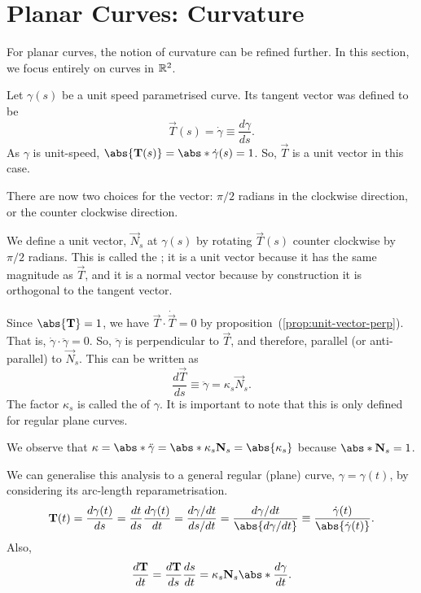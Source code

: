 \documentclass[11pt]{penrose}
\newcommand{\vT}{\vec{T}}
\newcommand{\vN}{\vec{N}}
\begin{document}
\section{Planar Curves: Curvature}

For planar curves, the notion of curvature can be refined further. In this section, we focus entirely on curves in $\mathbb{R}^2$.

Let $\gamma(s)$ be a unit speed parametrised curve. Its tangent vector was defined to be
\begin{equation}
    \vT(s) = \dot{\gamma} \equiv \frac{d\gamma}{ds}.
    \label{eq:tangent-dfn}
\end{equation}
As $\gamma$ is unit-speed, $\abs{\vT(s)} = \abs*{\dot{\gamma}(s)} = 1$. So, $\vT$ is a unit vector in this case.

There are now two choices for the  vector: $\pi/2$ radians in the clockwise direction, or the counter clockwise direction.

We define a unit vector, $\vN_s$ at $\gamma(s)$ by rotating $\vT(s)$ counter clockwise by $\pi/2$ radians. This is called the ; it is a unit vector because it has the same magnitude as $\vT$, and it is a normal vector because by construction it is orthogonal to the tangent vector.

Since $\abs{\vT} = 1$, we have $\vT \cdot \dot{\vT} = 0$ by proposition~(\ref{prop:unit-vector-perp}). That is, $\dot{\gamma} \cdot \ddot{\gamma} = 0$. So, $\ddot{\gamma}$ is perpendicular to $\vT$, and therefore, parallel (or anti-parallel) to $\vN_s$. This can be written as
\begin{equation}
    \frac{d\vT}{ds} \equiv \ddot{\gamma} = \kappa_s \vN_s.
\end{equation}
The factor $\kappa_s$ is called the  of $\gamma$. It is important to note that this is only defined for regular plane curves.

We observe that $\kappa = \abs*{\ddot{\gamma}} = \abs*{\kappa_s \vN_s} = \abs{\kappa_s}$ because $\abs*{\vN_s} = 1$.


We can generalise this analysis to a general regular (plane) curve, $\gamma = \gamma(t)$, by considering its arc-length reparametrisation.
\begin{equation}
    \vT(t)
    = \frac{d\gamma(t)}{ds}
    = \frac{dt}{ds} \frac{d\gamma(t)}{dt}
    = \frac{d\gamma/dt}{ds/dt}
    = \frac{d\gamma/dt}{\abs{d\gamma/dt}}
    \equiv \frac{\dot{\gamma}(t)}{\abs{\dot{\gamma}(t)}}.
\end{equation}
Also,
\begin{equation*}
    \frac{d\vT}{dt}
    = \frac{d\vT}{ds} \frac{ds}{dt}
    = \kappa_s \vN_s \abs*{\frac{d\gamma}{dt}}.
\end{equation*}
\end{document}

